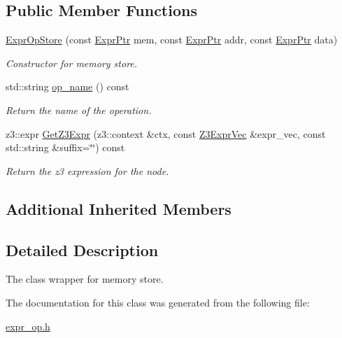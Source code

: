\subsection*{Public Member Functions}
\begin{DoxyCompactItemize}
\item 
\mbox{\label{classilang_1_1_expr_op_store_a5c92ad69283a8dd304b9e56d6ae31444}} 
\mbox{\hyperlink{classilang_1_1_expr_op_store_a5c92ad69283a8dd304b9e56d6ae31444}{Expr\+Op\+Store}} (const \mbox{\hyperlink{classilang_1_1_expr_a85952b6a34620c4c8cab6bac9c9fdf8c}{Expr\+Ptr}} mem, const \mbox{\hyperlink{classilang_1_1_expr_a85952b6a34620c4c8cab6bac9c9fdf8c}{Expr\+Ptr}} addr, const \mbox{\hyperlink{classilang_1_1_expr_a85952b6a34620c4c8cab6bac9c9fdf8c}{Expr\+Ptr}} data)
\begin{DoxyCompactList}\small\item\em Constructor for memory store. \end{DoxyCompactList}\item 
\mbox{\label{classilang_1_1_expr_op_store_add3a6a69b0f6370fba99c1d8d73553bb}} 
std\+::string \mbox{\hyperlink{classilang_1_1_expr_op_store_add3a6a69b0f6370fba99c1d8d73553bb}{op\+\_\+name}} () const
\begin{DoxyCompactList}\small\item\em Return the name of the operation. \end{DoxyCompactList}\item 
\mbox{\label{classilang_1_1_expr_op_store_a127495a14cb8f11089831b029a18545c}} 
z3\+::expr \mbox{\hyperlink{classilang_1_1_expr_op_store_a127495a14cb8f11089831b029a18545c}{Get\+Z3\+Expr}} (z3\+::context \&ctx, const \mbox{\hyperlink{namespaceilang_adc4eee919aa24fff882d03a48d733c19}{Z3\+Expr\+Vec}} \&expr\+\_\+vec, const std\+::string \&suffix=\char`\"{}\char`\"{}) const
\begin{DoxyCompactList}\small\item\em Return the z3 expression for the node. \end{DoxyCompactList}\end{DoxyCompactItemize}
\subsection*{Additional Inherited Members}


\subsection{Detailed Description}
The class wrapper for memory store. 

The documentation for this class was generated from the following file\+:\begin{DoxyCompactItemize}
\item 
\mbox{\hyperlink{expr__op_8h}{expr\+\_\+op.\+h}}\end{DoxyCompactItemize}
